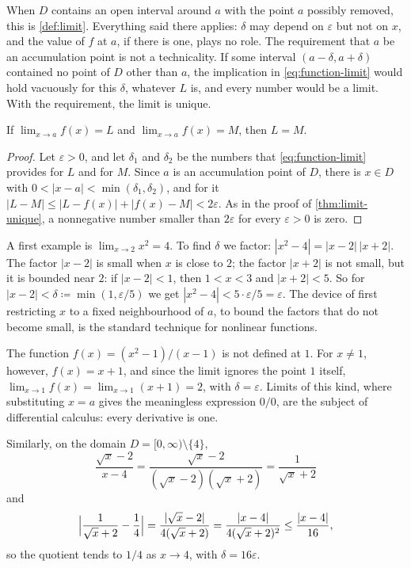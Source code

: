 When $D$ contains an open interval around $a$ with the point $a$ possibly removed, this is \cref{def:limit}. Everything said there applies: $\delta$ may depend on $\varepsilon$ but not on $x$, and the value of $f$ at $a$, if there is one, plays no role. The requirement that $a$ be an accumulation point is not a technicality. If some interval $(a-\delta,a+\delta)$ contained no point of $D$ other than $a$, the implication in \eqref{eq:function-limit} would hold vacuously for this $\delta$, whatever $L$ is, and every number would be a limit. With the requirement, the limit is unique.

\begin{proposition}
\label{prop:function-limit-unique}
If $\lim_{x\to a}f(x)=L$ and $\lim_{x\to a}f(x)=M$, then $L=M$.
\end{proposition}

\begin{proof}
Let $\varepsilon>0$, and let $\delta_1$ and $\delta_2$ be the numbers that \eqref{eq:function-limit} provides for $L$ and for $M$. Since $a$ is an accumulation point of $D$, there is $x\in D$ with $0<|x-a|<\min(\delta_1,\delta_2)$, and for it $|L-M|\le|L-f(x)|+|f(x)-M|<2\varepsilon$. As in the proof of \cref{thm:limit-unique}, a nonnegative number smaller than $2\varepsilon$ for every $\varepsilon>0$ is zero.
\end{proof}

A first example is $\lim_{x\to2}x^2=4$. To find $\delta$ we factor: $|x^2-4|=|x-2|\,|x+2|$. The factor $|x-2|$ is small when $x$ is close to $2$; the factor $|x+2|$ is not small, but it is bounded near $2$: if $|x-2|<1$, then $1<x<3$ and $|x+2|<5$. So for $|x-2|<\delta\coloneqq\min(1,\varepsilon/5)$ we get $|x^2-4|<5\cdot\varepsilon/5=\varepsilon$. The device of first restricting $x$ to a fixed neighbourhood of $a$, to bound the factors that do not become small, is the standard technique for nonlinear functions.

The function $f(x)=(x^2-1)/(x-1)$ is not defined at $1$. For $x\ne1$, however, $f(x)=x+1$, and since the limit ignores the point $1$ itself, $\lim_{x\to1}f(x)=\lim_{x\to1}(x+1)=2$, with $\delta=\varepsilon$. Limits of this kind, where substituting $x=a$ gives the meaningless expression $0/0$, are the subject of differential calculus: every derivative is one.

Similarly, on the domain $D=[0,\infty)\setminus\{4\}$,
\[
\frac{\sqrt x-2}{x-4}=\frac{\sqrt x-2}{(\sqrt x-2)(\sqrt x+2)}=\frac1{\sqrt x+2}
\]
and
\[
\Bigl|\frac1{\sqrt x+2}-\frac14\Bigr|=\frac{|\sqrt x-2|}{4(\sqrt x+2)}=\frac{|x-4|}{4(\sqrt x+2)^2}\le\frac{|x-4|}{16},
\]
so the quotient tends to $1/4$ as $x\to4$, with $\delta=16\varepsilon$.

